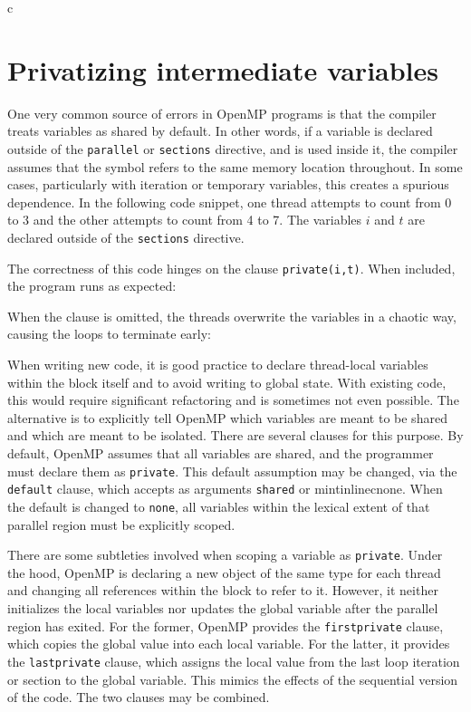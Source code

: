 \documentclass[conference, a4paper]{IEEEtran-modified}
\begin{document}
\begin{ccode}[]{c}
\section{Privatizing intermediate variables}

  One very common source of errors in OpenMP programs is that the compiler treats variables as shared by default. In other words, if a variable is declared outside of the \texttt{parallel} or \texttt{sections} directive, and is used inside it, the compiler assumes that the symbol refers to the same memory location throughout. In some cases, particularly with iteration or temporary variables, this creates a spurious dependence. In the following code snippet, one thread attempts to count from 0 to 3 and the other attempts to count from 4 to 7. The variables $i$ and $t$ are declared outside of the \texttt{sections} directive. 



  The correctness of this code hinges on the clause \texttt{private(i,t)}. When included, the program runs as expected:


  When the clause is omitted, the threads overwrite the variables in a chaotic way, causing the loops to terminate early:


  When writing new code, it is good practice to declare thread-local variables within the block itself and to avoid writing to global state. With existing code, this would require significant refactoring and is sometimes not even possible. The alternative is to explicitly tell OpenMP which variables are meant to be shared and which are meant to be isolated. There are several clauses for this purpose. By default, OpenMP assumes that all variables are shared, and the programmer must declare them as \texttt{private}. This default assumption may be changed, via the \texttt{default} clause, which accepts as arguments \texttt{shared} or  
  mintinline{c}{none}. When the default is changed to \texttt{none}, all variables within the lexical extent of that parallel region must be explicitly scoped. 

  There are some subtleties involved when scoping a variable as \texttt{private}. Under the hood, OpenMP is declaring a new object of the same type for each thread and changing all references within the block to refer to it. However, it neither initializes the local variables nor updates the global variable after the parallel region has exited. For the former, OpenMP provides the \texttt{firstprivate} clause, which copies the global value into each local variable. For the latter, it provides the \texttt{lastprivate} clause, which assigns the local value from the last loop iteration or section to the global variable. This mimics the effects of the sequential version of the code. The two clauses may be combined.


\end{ccode}
\end{document}
